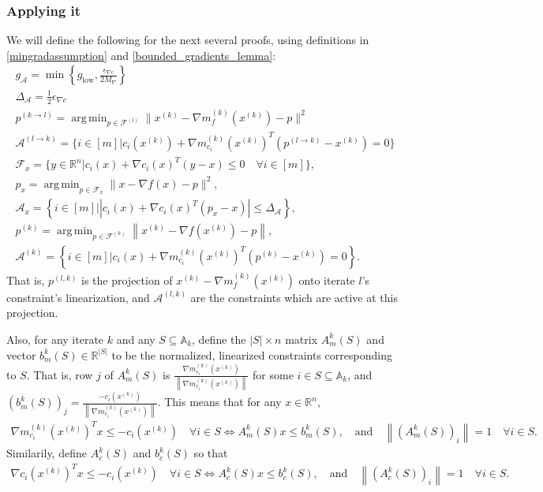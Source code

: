 \documentclass{article}
\theoremstyle{case}
\numberwithin{theorem}{subsection}
\DeclareMathOperator*{\argmin}{arg\,min}
\newcommand{\activeconstraintsk}{{\mathbb A_{k}}}
\newcommand{\feasiblek}{{\mathcal F^{(k)}}}
\newcommand{\gk}{{\nabla m_f^{(k)}\left(\xk\right)}}
\newcommand{\gmcik}{{\nabla m_{c_i}^{(k)}\left(\xk\right)}}
\newcommand{\gradf}{\nabla f}
\newcommand{\maxgrad}{{M_{\nabla}}}
\newcommand{\minactivegraddelta}{{\Delta_{\mathcal A}}}
\newcommand{\minactivegrad}{{ g_{\mathcal A} }}
\newcommand{\mingradepsilon}{{\epsilon_{\nabla c}}}
\newcommand{\mingrad}{{ g_{\textrm{low}} }}
\newcommand{\Rn}{\mathbb R^n}
\newcommand{\xk}{x^{(k)}}
\begin{document}
\subsubsection{Applying it}
\color{red}
We will define the following for the next several proofs, using definitions in \cref{mingradassumption} and \cref{bounded_gradients_lemma}:
\begin{align}
\minactivegrad = \min\left\{\mingrad, \frac {\mingradepsilon} {2 \maxgrad}  \right\} \label{define_minactivegrad_orig} \\
\minactivegraddelta = \frac 1 2 \mingradepsilon \label{define_minactivedelta_orig} \\
p^{(k \to l)} = \argmin_{p \in \mathcal F^{(l)}} \|\xk - \gk - p\|^2 \label{bp_define_plk_orig} \\
\mathcal A^{(l \to k)} = \{i \in [m] | c_i(\xk) + \gmcik^T(p^{(l\to k)} - \xk) = 0 \} \label{bp_define_activep} \\
\mathcal F_x = \{ y \in \Rn | c_i(x) + \nabla c_i(x)^T(y - x) \le 0 \quad \forall i \in [m]\}, \label{bp_define_true_linearization} \\
p_x = \argmin_{p \in \mathcal F_x} \|x - \gradf(x) - p\|^2, \label{bp_define_true_projection} \\
\mathcal A_x = \left\{i \in [m] | \left|c_i(x) + \nabla c_i(x)^T(p_x - x)\right| \le \minactivegraddelta \right\}, \label{define_projection_active} \\
p^{(k)} = \argmin_{p \in \feasiblek} \left\| \xk - \nabla f\left(\xk\right) - p \right\|, \label{bp_define_pl} \\
\mathcal A^{(k)} = \left\{i \in [m] | c_i(x) + \gmcik^T\left(p^{(k)} - \xk\right) = 0 \right\}. \label{bp_define_yet_another_thing}
\end{align}
That is, $p^{(l, k)}$ is the projection of $\xk - \gk$ onto iterate $l$'s constraint's linearization,
and $\mathcal A^{(l, k)}$ are the constraints which are active at this projection.

Also, for any iterate $k$ and any $S \subseteq \activeconstraintsk$,
define the $|S|\times n$ matrix $A^k_m(S)$ and vector $b^k_m(S) \in \mathbb R^{|S|}$ 
to be the normalized, linearized constraints corresponding to $S$.
That is, row $j$ of $A^k_m(S)$ is $\frac{\gmcik}{\left\|\gmcik\right\|}$ for some $i \in S\subseteq \activeconstraintsk$, 
and $\left(b^k_m(S)\right)_j = \frac{-c_i(\xk)}{\left\|\gmcik\right\|}$. 
This means that for any $x \in \Rn$,
\begin{align}
\gmcik^T x \le -c_i(\xk) \quad \forall i \in S \Longleftrightarrow A^k_m(S) x \le b^k_m(S), \quad \textrm{and} \quad \left\|\left(A^k_m(S)\right)_i\right\| = 1 \quad \forall i \in S.
\label{define_normalized_model_constraints}
\end{align}
Similarily, define $A^k_c(S)$ and $b^k_c(S)$ so that 
\begin{align}
\nabla c_i\left(\xk\right)^T x \le -c_i(\xk) \quad \forall i \in S \Longleftrightarrow A^k_c(S) x \le b^k_c(S), \quad \textrm{and} \quad \left\|\left(A^k_c(S)\right)_i\right\| = 1 \quad \forall i \in S.
\label{define_normalized_true_constraints}
\end{align}
\end{document}
